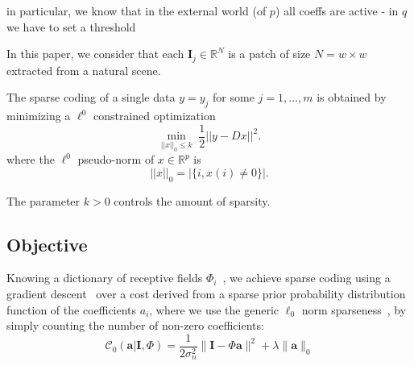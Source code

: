 \documentclass[a4paper, 11pt, draft]{article} %
\newcommand{\umin}[1]{\underset{#1}{\min}\;}
\newcommand{\enscond}[2]{\lbrace #1, #2 \rbrace}
\newcommand{\norm}[1]{|\!| #1 |\!|}
\newcommand{\abs}[1]{\left|#1\right|}
\newcommand{\RR}{\mathbb{R}}
\newcommand{\coef}{\mathbf{a}} %
\newcommand{\image}{\mathbf{I}} %
\newcommand{\dico}{\Phi} %
\begin{document}

in particular, we know that in the external world (of $p$) all coeffs are active - in $q$ we have to set a threshold


In this paper, we consider that each $\image_j \in \RR^N$ is a patch of size $N=w \times w$ extracted from a natural scene.

%
%
%


The sparse coding of a single data $y=y_j$ for some $j=1,\ldots,m$
is obtained by minimizing a $\ell^0$ constrained optimization
$$ \umin{ \norm{x}_0 \leq k } \frac{1}{2}\norm{y-Dx}^2 .  $$
where the $\ell^0$ pseudo-norm of $x \in \RR^p$ is
$$ \norm{x}_0 = \abs{\enscond{i}{x(i) \neq 0}}. $$


The parameter $k>0$ controls the amount of sparsity.



\subsection{Objective}\label{objective}



Knowing a dictionary of receptive fields $\dico_i$~\citep{hubel1968receptive}, we achieve sparse coding using a gradient descent~\citep{olshausen1996emergence,Olshausen97} over a  cost derived from a sparse prior probability distribution function of the coefficients $a_i$, where we use the generic $\ell_0$ norm sparseness~\citep{Perrinet10shl,Perrinet15bicv}, by simply counting the number of non-zero coefficients:
\begin{equation}%
\mathcal{C}_0( \coef | \image , \dico) = \frac{1}{2\sigma_n^2} \| \image - \dico \coef \|^2 + \lambda \| \coef \|_0 \nonumber%
\end{equation}%
\end{document}
